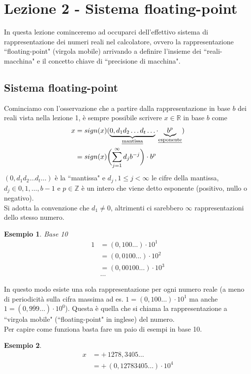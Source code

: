 \documentclass[12pt]{article}
\newtheorem*{esempio}{Esempio}
\begin{document}
\section{Lezione 2 - Sistema floating-point}
In questa lezione cominceremo ad occuparci dell'effettivo sistema di rappresentazione dei numeri reali nel calcolatore, ovvero la rappresentazione ``floating-point" (virgola mobile) arrivando a definire l'insieme dei ``reali-macchina" e il concetto chiave di ``precisione di macchina".

\subsection{Sistema floating-point}
Cominciamo con l'osservazione che a partire dalla rappresentazione in base $b$ dei reali vista nella lezione 1, è sempre possibile scrivere $x \in \mathbb{R}$ in base $b$ come 
\[ \begin{split}
    x & = sign(x)( \underbrace{0,d_1 d_2 \dotsc d_t \dotsc}_{\text {\uline{mantissa}}} \cdot {\underbrace{b^p}_{\text{\uline{esponente}}}}) \\
    & = sign(x)\biggl( \sum_{j=1}^{\infty} d_j b^{-j} \biggr) \cdot b^p
\end{split} \]
$(0,d_1 d_2 \dotsc d_t \dotsc)$ è la ``mantissa" e $d_j\, , 1 \le j < \infty$ le cifre della mantissa, $d_j \in {0, 1, \dotsc , b-1}$ e $p \in \mathbb{Z}$ è un intero che viene detto esponente (positivo, nullo o negativo). \\
Si adotta la convenzione che $d_1 \ne 0$, altrimenti ci sarebbero $\infty$ rappresentazioni dello stesso numero.
\begin{esempio}
Base 10
\[ \begin{split}
    1 & = (0,100 \dotsc) \cdot 10^1 \\
    & = (0,0100 \dotsc) \cdot 10^2 \\
    & = (0,00100 \dotsc) \cdot 10^3 \\
    & \dotsc
\end{split}\]
\end{esempio}
In questo modo esiste una sola rappresentazione per ogni numero reale (a meno di periodicità sulla cifra massima ad es. $1 = (0,100 \dotsc) \cdot 10^1$ ma anche $1 = (0,\overline{999} \dotsc) \cdot 10^0$). Questa è quella che si chiama la rappresentazione a ``virgola mobile" (``floating-point" in inglese) del numero. \\
Per capire come funziona basta fare un paio di esempi in base 10.
\begin{esempio}
\[\begin{split}
    x & = + \, 1278,3405 \dotsc \\
    & = + \, (0,12783405 \dotsc) \cdot 10^4 
\end{split}\]
\end{esempio}
\end{document}

